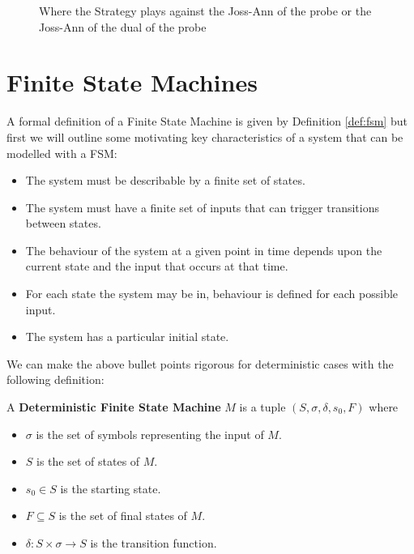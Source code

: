 \begin{figure}[!hbtp]
    \begin{center}
        
        \caption{Where the Strategy plays against the Joss-Ann of the probe or the Joss-Ann of the dual of the probe}\label{fig:DualProbe}
    \end{center}
\end{figure}

\section{Finite State Machines}\label{sec:fsm}

A formal definition of a Finite State Machine is given by Definition \ref{def:fsm} but first we will outline some motivating key characteristics of a system that can be modelled with a FSM:

\begin{itemize}
 \item The system must be describable by a finite set of states.
 \item The system must have a finite set of inputs that can trigger transitions between states.
 \item The behaviour of the system at a given point in time depends upon the current state and the input that occurs at that time.
 \item For each state the system may be in, behaviour is defined for each possible input.
 \item The system has a particular initial state.
\end{itemize}

We can make the above bullet points rigorous for deterministic cases with the following definition:

\begin{definition}\label{def:fsm}
A \textbf{Deterministic Finite State Machine} $M$ is a tuple $(S, \sigma, \delta, s_0, F)$ where
\begin{itemize}
 \item $\sigma$ is the set of symbols representing the input of $M$.
 \item $S$ is the set of states of $M$.
 \item $s_0 \in S$ is the starting state.
 \item $F \subseteq S$ is the set of final states of $M$.
 \item $\delta: S \times \sigma \rightarrow S$ is the transition function.
\end{itemize}
\end{definition}

